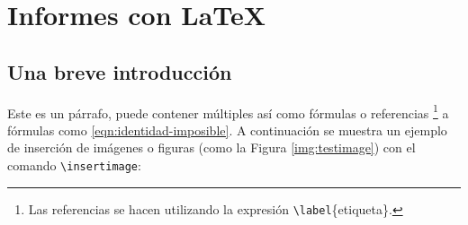 %
%

\section{Informes con \LaTeX}
	
	\subsection{Una breve introducción}
		
		Este es un párrafo, puede contener múltiples  así como fórmulas o referencias \footnote{Las referencias se hacen utilizando la expresión \texttt{\textbackslash label}\{etiqueta\}.} a fórmulas como \eqref{eqn:identidad-imposible}. A continuación se muestra un ejemplo de inserción de imágenes o figuras (como la Figura \ref{img:testimage}) con el comando \texttt{\textbackslash insertimage}:
		
		
